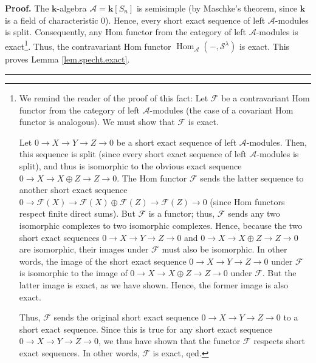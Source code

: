 \documentclass[numbers=enddot,12pt,final,onecolumn,notitlepage]{scrartcl}%
\theoremstyle{definition}
\newenvironment{proof}[1][Proof]{\noindent\textbf{#1.} }{\ \rule{0.5em}{0.5em}}
\begin{document}
\begin{proof}
The $\mathbf{k}$-algebra $\mathcal{A}=\mathbf{k}\left[  S_{n}\right]  $ is
semisimple (by Maschke's theorem, since $\mathbf{k}$ is a field of
characteristic $0$). Hence, every short exact sequence of left $\mathcal{A}%
$-modules is split. Consequently, any Hom functor from the category of left
$\mathcal{A}$-modules is exact\footnote{We remind the reader of the proof of
this fact: Let $\mathcal{F}$ be a contravariant Hom functor from the category
of left $\mathcal{A}$-modules (the case of a covariant Hom functor is
analogous). We must show that $\mathcal{F}$ is exact.
\par
Let $0\rightarrow X\rightarrow Y\rightarrow Z\rightarrow0$ be a short exact
sequence of left $\mathcal{A}$-modules. Then, this sequence is split (since
every short exact sequence of left $\mathcal{A}$-modules is split), and thus
is isomorphic to the obvious exact sequence $0\rightarrow X\rightarrow X\oplus
Z\rightarrow Z\rightarrow0$. The Hom functor $\mathcal{F}$ sends the latter
sequence to another short exact sequence $0\rightarrow\mathcal{F}\left(
X\right)  \rightarrow\mathcal{F}\left(  X\right)  \oplus\mathcal{F}\left(
Z\right)  \rightarrow\mathcal{F}\left(  Z\right)  \rightarrow0$ (since Hom
functors respect finite direct sums). But $\mathcal{F}$ is a functor; thus,
$\mathcal{F}$ sends any two isomorphic complexes to two isomorphic complexes.
Hence, because the two short exact sequences $0\rightarrow X\rightarrow
Y\rightarrow Z\rightarrow0$ and $0\rightarrow X\rightarrow X\oplus
Z\rightarrow Z\rightarrow0$ are isomorphic, their images under $\mathcal{F}$
must also be isomorphic. In other words, the image of the short exact sequence
$0\rightarrow X\rightarrow Y\rightarrow Z\rightarrow0$ under $\mathcal{F}$ is
isomorphic to the image of $0\rightarrow X\rightarrow X\oplus Z\rightarrow
Z\rightarrow0$ under $\mathcal{F}$. But the latter image is exact, as we have
shown. Hence, the former image is also exact.
\par
Thus, $\mathcal{F}$ sends the original short exact sequence $0\rightarrow
X\rightarrow Y\rightarrow Z\rightarrow0$ to a short exact sequence. Since this
is true for any short exact sequence $0\rightarrow X\rightarrow Y\rightarrow
Z\rightarrow0$, we thus have shown that the functor $\mathcal{F}$ respects
short exact sequences. In other words, $\mathcal{F}$ is exact, qed.}. Thus,
the contravariant Hom functor $\operatorname*{Hom}\nolimits_{\mathcal{A}%
}\left(  -,\mathcal{S}^{\lambda}\right)  $ is exact. This proves Lemma
\ref{lem.specht.exact}.
\end{proof}
\end{document}
